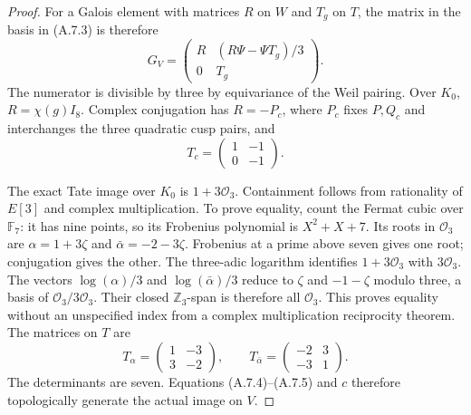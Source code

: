 \begin{proof}
For a Galois element with matrices $R$ on $W$ and $T_g$ on $T$,
the matrix in the basis in (A.7.3) is therefore
\[
 G_V=\begin{pmatrix}
 R&(R\Psi-\Psi T_g)/3\\0&T_g
 \end{pmatrix}.
 \tag{A.7.4}
\]
The numerator is divisible by three by equivariance of the Weil
pairing. Over $K_0$, $R=\chi(g)I_8$. Complex conjugation has
$R=-P_c$, where $P_c$ fixes $P,Q_c$ and interchanges the three
quadratic cusp pairs, and
\[
 T_c=\begin{pmatrix}1&-1\\0&-1\end{pmatrix}.
\]

The exact Tate image over $K_0$ is $1+3\mathcal O_3$.
Containment follows from rationality of $E[3]$ and complex
multiplication. To prove equality, count the Fermat cubic over
$\mathbb F_7$: it has nine points, so its Frobenius polynomial is
$X^2+X+7$. Its roots in $\mathcal O_3$ are
$\alpha=1+3\zeta$ and $\bar\alpha=-2-3\zeta$. Frobenius at a prime
above seven gives one root; conjugation gives the other. The
three-adic logarithm identifies $1+3\mathcal O_3$ with
$3\mathcal O_3$. The vectors
$\log(\alpha)/3$ and $\log(\bar\alpha)/3$ reduce to
$\zeta$ and $-1-\zeta$ modulo three, a basis of
$\mathcal O_3/3\mathcal O_3$. Their closed $\mathbb Z_3$-span is
therefore all $\mathcal O_3$. This proves equality without an
unspecified index from a complex multiplication reciprocity theorem.
The matrices on $T$ are
\[
 T_\alpha=\begin{pmatrix}1&-3\\3&-2\end{pmatrix},\qquad
 T_{\bar\alpha}=\begin{pmatrix}-2&3\\-3&1\end{pmatrix}.
 \tag{A.7.5}
\]
The determinants are seven. Equations (A.7.4)--(A.7.5) and $c$
therefore topologically generate the actual image on $V$.


\end{proof}

